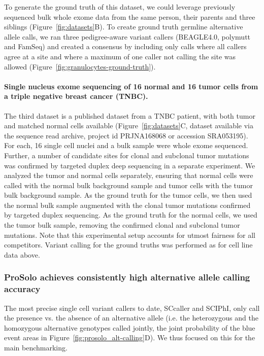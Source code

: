 \documentclass[12pt,inline]{wlscirep}
\begin{document}
To generate the ground truth of this dataset, we could leverage previously sequenced bulk whole exome data from the same person, their parents and three siblings \cite{hoell_constitutional_2014} (Figure~\ref{fig:datasets}B).
To create ground truth germline alternative allele calls, we ran three pedigree-aware variant callers (BEAGLE4.0\cite{browning_improving_2013}, polymutt\cite{li_likelihood-based_2012} and FamSeq\cite{peng_rare_2013,peng_famseq:_2014}) and created a consensus by including only calls where all callers agree at a site and where a maximum of one caller not calling the site was allowed (Figure~\ref{fig:granulocytes-ground-truth}).

\paragraph{Single nucleus exome sequencing of 16 normal and 16 tumor cells from a triple negative breast cancer (TNBC)\cite{wang_clonal_2014}.}
The third dataset is a published dataset from a TNBC patient, with both tumor and matched normal cells available (Figure~\ref{fig:datasets}C, dataset available via the sequence read archive, project id \mbox{PRJNA168068} or accession \mbox{SRA053195}).
For each, 16 single cell nuclei and a bulk sample were whole exome sequenced.
Further, a number of candidate sites for clonal and subclonal tumor mutations was confirmed by targeted duplex deep sequencing in a separate experiment\cite{wang_clonal_2014}.
We analyzed the tumor and normal cells separately, ensuring that normal cells were called with the normal bulk background sample and tumor cells with the tumor bulk background sample.
As the ground truth for the tumor cells, we then used the normal bulk sample augmented with the clonal tumor mutations confirmed by targeted duplex sequencing.
As the ground truth for the normal cells, we used the tumor bulk sample, removing the confirmed clonal and subclonal tumor mutations. Note that this experimental setup accounts for utmost fairness for all competitors. 
Variant calling for the ground truths was performed as for cell line data above.

\subsubsection{ProSolo achieves consistently high alternative allele calling accuracy}

The most precise single cell variant callers to date, SCcaller and SCIPhI, only call the presence vs. the absence of an alternative allele (i.e. the heterozygous and the homozygous alternative genotypes called jointly, the joint probability of the blue event areas in Figure~\ref{fig:prosolo_alt-calling}D).
We thus focused on this for the main benchmarking.
\end{document}

